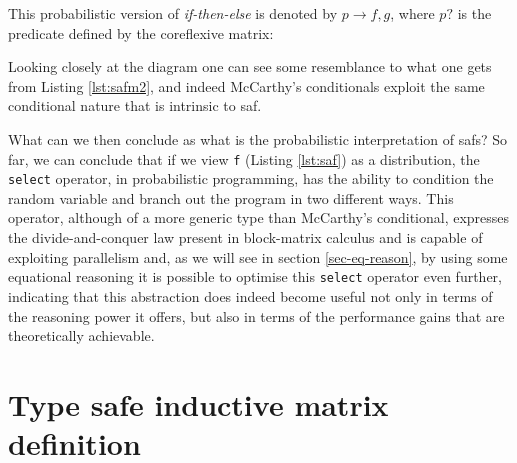 \documentclass[
  oneside,
  11pt, a4paper,
  footinclude=true,
  headinclude=true,
  cleardoublepage=empty
]{scrbook}
\theoremstyle{definition}
\theoremstyle{definition}
\begin{document}
        \begin{center}\label{dig-mccarthy}
        \end{center}{}
        
        This probabilistic version of \emph{if-then-else} is denoted by $p \rightarrow f,g$, where $p?$ is the predicate defined by the coreflexive matrix:
        
        \begin{center}
        \end{center}{}
        
        Looking closely at the diagram one can see some resemblance to what one gets from Listing \ref{lst:safm2}, and indeed McCarthy's conditionals exploit the same conditional nature that is intrinsic to \gls{saf}.
        
        What can we then conclude as what is the probabilistic interpretation of \glspl{saf}? So far, we can conclude that if we view \texttt{f} (Listing \ref{lst:saf}) as a distribution, the \texttt{select} operator, in probabilistic programming, has the ability to condition the random variable and branch out the program in two different ways. This operator, although of a more generic type than McCarthy's conditional, expresses the divide-and-conquer law present in block-matrix calculus and is capable of exploiting parallelism and, as we will see in section \ref{sec-eq-reason}, by using some equational reasoning it is possible to optimise this \texttt{select} operator even further, indicating that this abstraction does indeed become useful not only in terms of the reasoning power it offers, but also in terms of the performance gains that are theoretically achievable.
        
	\section{Type safe inductive matrix definition}
	    
\end{document}
